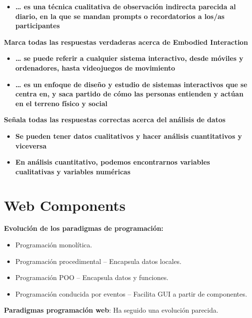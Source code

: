 \documentclass[12pt]{report} %
\begin{document}
\begin{itemize}

\item
  \textbf{\ldots{} es una técnica cualitativa de observación indirecta
  parecida al diario, en la que se mandan prompts o recordatorios a
  los/as participantes}
\end{itemize}

\textbf{Marca todas las respuestas verdaderas acerca de Embodied
Interaction}

\begin{itemize}

\item
  \textbf{\ldots{} se puede referir a cualquier sistema interactivo,
  desde móviles y ordenadores, hasta videojuegos de movimiento}
\item
  \textbf{\ldots{} es un enfoque de diseño y estudio de sistemas
  interactivos que se centra en, y saca partido de cómo las personas
  entienden y actúan en el terreno físico y social}
\end{itemize}

\textbf{Señala todas las respuestas correctas acerca del análisis de
datos}

\begin{itemize}

\item
  \textbf{Se pueden tener datos cualitativos y hacer análisis
  cuantitativos y viceversa}
\item
  \textbf{En análisis cuantitativo, podemos encontrarnos variables
  cualitativas y variables numéricas}
\end{itemize}

\chapter{Web Components}

\textbf{Evolución de los paradigmas de programación:}

\begin{itemize}
\item Programación monolítica.
\item Programación procedimental -- Encapsula datos locales.
\item Programación POO -- Encapsula datos y funciones.
\item Programación conducida por eventos -- Facilita GUI a partir de componentes.
\end{itemize}

\textbf{Paradigmas programación web}: Ha seguido una evolución parecida.
\end{document}
